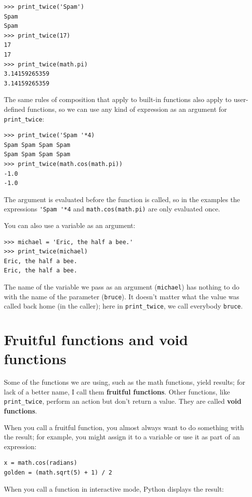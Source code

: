 \documentclass[10pt]{book}
\begin{document}
\beforeverb
\begin{verbatim}
>>> print_twice('Spam')
Spam
Spam
>>> print_twice(17)
17
17
>>> print_twice(math.pi)
3.14159265359
3.14159265359
\end{verbatim}
\afterverb
%
The same rules of composition that apply to built-in functions also
apply to user-defined functions, so we can use any kind of expression
as an argument for \verb"print_twice":


\beforeverb
\begin{verbatim}
>>> print_twice('Spam '*4)
Spam Spam Spam Spam
Spam Spam Spam Spam
>>> print_twice(math.cos(math.pi))
-1.0
-1.0
\end{verbatim}
\afterverb
%
The argument is evaluated before the function is called, so
in the examples the expressions \verb"'Spam '*4" and
{\tt math.cos(math.pi)} are only evaluated once.


You can also use a variable as an argument:

\beforeverb
\begin{verbatim}
>>> michael = 'Eric, the half a bee.'
>>> print_twice(michael)
Eric, the half a bee.
Eric, the half a bee.
\end{verbatim}
\afterverb
%
The name of the variable we pass as an argument ({\tt michael}) has
nothing to do with the name of the parameter ({\tt bruce}).  It
doesn't matter what the value was called back home (in the caller);
here in \verb"print_twice", we call everybody {\tt bruce}.

\section{Fruitful functions and void functions}


Some of the functions we are using, such as the math functions, yield
results; for lack of a better name, I call them {\bf fruitful
  functions}.  Other functions, like \verb"print_twice", perform an
action but don't return a value.  They are called {\bf void
  functions}.

When you call a fruitful function, you almost always
want to do something with the result; for example, you might
assign it to a variable or use it as part of an expression:

\beforeverb
\begin{verbatim}
x = math.cos(radians)
golden = (math.sqrt(5) + 1) / 2
\end{verbatim}
\afterverb
%
When you call a function in interactive mode, Python displays
the result:
\end{document}
